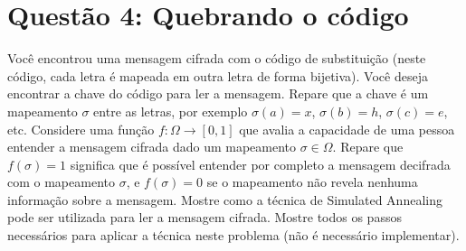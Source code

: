 \section*{Questão 4: Quebrando o código}

Você encontrou uma mensagem cifrada com o código de substituição (neste código, cada letra é mapeada em outra letra de forma bijetiva). Você deseja encontrar a chave do código para ler a mensagem. Repare que a chave é um mapeamento $\sigma$ entre as letras, por exemplo $\sigma(a) = x$, $\sigma(b) = h$, $\sigma(c) = e$, etc. Considere uma função $f : \Omega \rightarrow [0,1]$ que avalia a capacidade de uma pessoa entender a mensagem cifrada dado um mapeamento $\sigma \in \Omega$. Repare que $f(\sigma) = 1$ significa que é possível entender por completo a mensagem decifrada com o mapeamento $\sigma$, e $f(\sigma) = 0$ se o mapeamento não revela nenhuma informação sobre a mensagem. Mostre como a técnica de Simulated Annealing pode ser utilizada para ler a mensagem cifrada. Mostre todos os passos necessários para aplicar a técnica neste problema (não é necessário implementar).
\begin{resposta}
\end{resposta}
